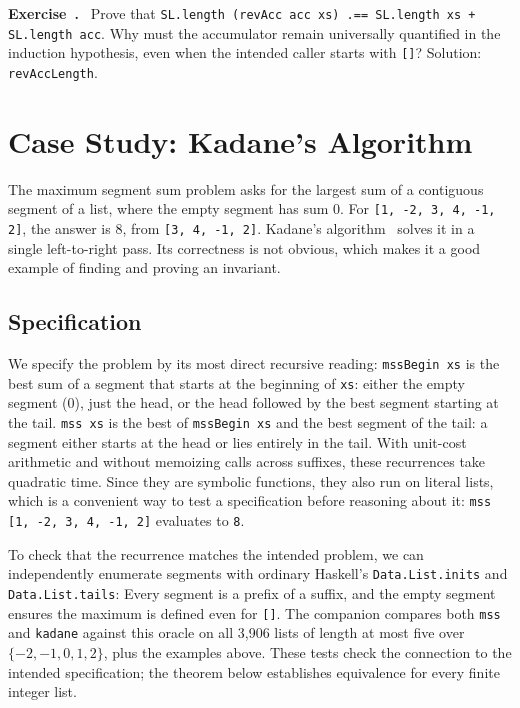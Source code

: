 \documentclass[acmsmall,screen,review,anonymous,nonacm]{acmart}
\newcommand{\code}[1]{\texttt{#1}}
\newcounter{exercise}
\newenvironment{exercise}{\refstepcounter{exercise}\par\medskip\noindent
  \textbf{Exercise~\theexercise.}\ }{\par\medskip}
\begin{document}
\begin{exercise}
Prove that \code{SL.length (revAcc acc xs) .== SL.length xs + SL.length acc}.
Why must the accumulator remain universally quantified in the induction
hypothesis, even when the intended caller starts with \code{[]}?
Solution: \code{revAccLength}.
\end{exercise}

\section{Case Study: Kadane's Algorithm}
\label{sec:kadane}

The maximum segment sum problem asks for the largest sum of a contiguous segment
of a list, where the empty segment has sum 0. For
\code{[1, -2, 3, 4, -1, 2]}, the answer is 8, from \code{[3, 4, -1, 2]}.
Kadane's algorithm~\citep[Algorithm~4]{bentley} solves it in a single left-to-right pass.
Its correctness is not obvious, which makes it a good example of finding and
proving an invariant.

\subsection{Specification}

We specify the problem by its most direct recursive reading:
\code{mssBegin xs} is the best sum of a segment that starts at the beginning of
\code{xs}: either the empty segment (0), just the head, or the head followed by
the best segment starting at the tail. \code{mss xs} is the best of
\code{mssBegin xs} and the best segment of the tail: a segment either starts at
the head or lies entirely in the tail. With unit-cost arithmetic and without
memoizing calls across suffixes, these recurrences take quadratic time. Since they are
symbolic functions, they also run on literal lists, which is a convenient way to
test a specification before reasoning about it:
\code{mss [1, -2, 3, 4, -1, 2]} evaluates to \code{8}.

To check that the recurrence matches the intended problem, we can independently
enumerate segments with ordinary Haskell's \code{Data.List.inits} and
\code{Data.List.tails}:
Every segment is a prefix of a suffix, and the empty segment ensures the
maximum is defined even for \code{[]}. The companion compares both \code{mss}
and \code{kadane} against this oracle on all 3,906 lists of length at most five
over $\{-2,-1,0,1,2\}$, plus the examples above. These tests check the connection
to the intended specification; the theorem below establishes equivalence for
every finite integer list.
\end{document}
